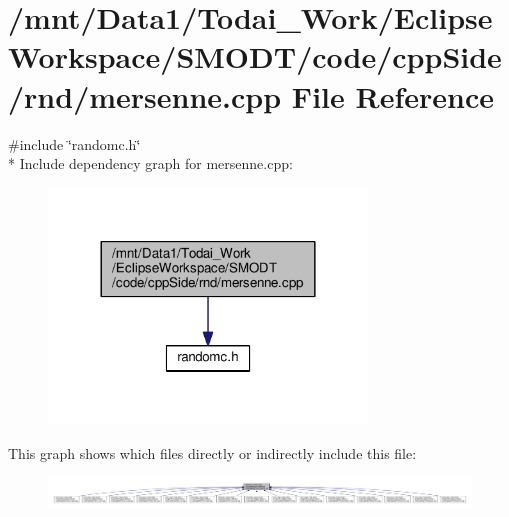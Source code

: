 \section{/mnt/\-Data1/\-Todai\-\_\-\-Work/\-Eclipse\-Workspace/\-S\-M\-O\-D\-T/code/cpp\-Side/rnd/mersenne.cpp File Reference}
\label{rnd_2mersenne_8cpp}
{\ttfamily \#include \char`\"{}randomc.\-h\char`\"{}}\\*
Include dependency graph for mersenne.\-cpp\-:
\nopagebreak
\begin{figure}[H]
\begin{center}
\leavevmode
\includegraphics[width=240pt]{rnd_2mersenne_8cpp__incl}
\end{center}
\end{figure}
This graph shows which files directly or indirectly include this file\-:
\nopagebreak
\begin{figure}[H]
\begin{center}
\leavevmode
\includegraphics[width=350pt]{rnd_2mersenne_8cpp__dep__incl}
\end{center}
\end{figure}
